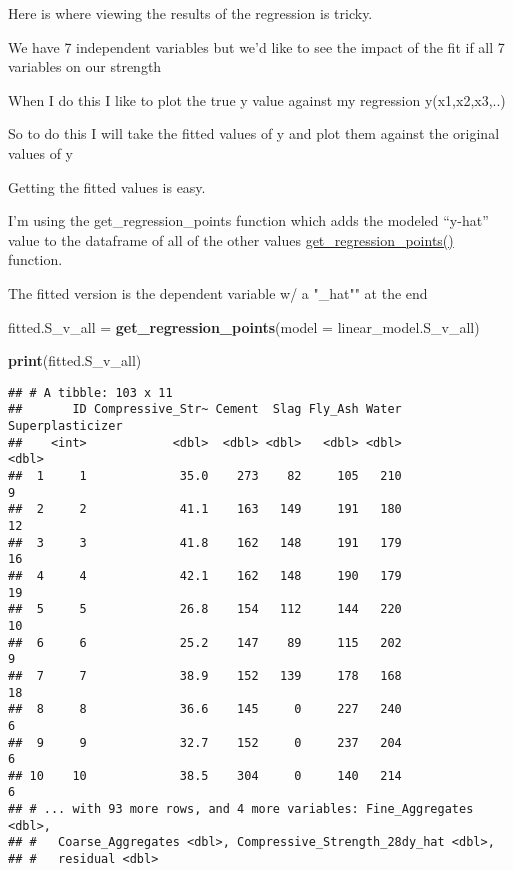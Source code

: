 \documentclass[]{article}
\newenvironment{Shaded}{\begin{snugshade}}{\end{snugshade}}
\newcommand{\DataTypeTok}[1]{\textcolor[rgb]{0.13,0.29,0.53}{#1}}
\newcommand{\KeywordTok}[1]{\textcolor[rgb]{0.13,0.29,0.53}{\textbf{#1}}}
\newcommand{\NormalTok}[1]{#1}
\newcommand{\StringTok}[1]{\textcolor[rgb]{0.31,0.60,0.02}{#1}}
\begin{document}
Here is where viewing the results of the regression is tricky.

We have 7 independent variables but we'd like to see the impact of the
fit if all 7 variables on our strength

When I do this I like to plot the true y value against my regression
y(x1,x2,x3,..)

So to do this I will take the fitted values of y and plot them against
the original values of y

Getting the fitted values is easy.

I'm using the get\_regression\_points function which adds the modeled
``y-hat'' value to the dataframe of all of the other values
\href{https://www.rdocumentation.org/packages/stats/versions/3.5.1/topics/fitted}{get\_regression\_points()}
function.

The fitted version is the dependent variable w/ a "\_hat"" at the end

\begin{Shaded}
\begin{Highlighting}[]
\NormalTok{fitted.S_v_all =}\StringTok{ }\KeywordTok{get_regression_points}\NormalTok{(}\DataTypeTok{model =}\NormalTok{ linear_model.S_v_all)}

\KeywordTok{print}\NormalTok{(fitted.S_v_all)}
\end{Highlighting}
\end{Shaded}

\begin{verbatim}
## # A tibble: 103 x 11
##       ID Compressive_Str~ Cement  Slag Fly_Ash Water Superplasticizer
##    <int>            <dbl>  <dbl> <dbl>   <dbl> <dbl>            <dbl>
##  1     1             35.0    273    82     105   210                9
##  2     2             41.1    163   149     191   180               12
##  3     3             41.8    162   148     191   179               16
##  4     4             42.1    162   148     190   179               19
##  5     5             26.8    154   112     144   220               10
##  6     6             25.2    147    89     115   202                9
##  7     7             38.9    152   139     178   168               18
##  8     8             36.6    145     0     227   240                6
##  9     9             32.7    152     0     237   204                6
## 10    10             38.5    304     0     140   214                6
## # ... with 93 more rows, and 4 more variables: Fine_Aggregates <dbl>,
## #   Coarse_Aggregates <dbl>, Compressive_Strength_28dy_hat <dbl>,
## #   residual <dbl>
\end{verbatim}
\end{document}
